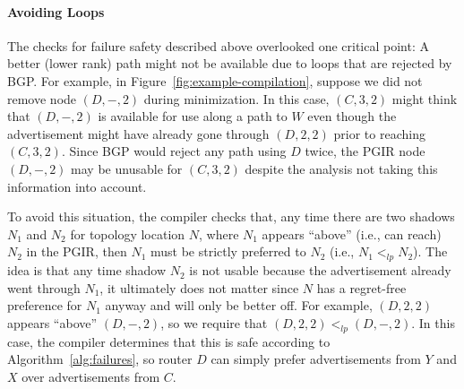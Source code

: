 \documentclass[10pt]{sigalternate052015}
\newcommand{\para}[1]{\paragraph*{\textbf{#1}}}
\begin{document}
\para{Avoiding Loops}

The checks for failure safety described above overlooked one critical point: A better (lower rank) path might not be available due to loops that are rejected by BGP.
%
For example, in Figure~\ref{fig:example-compilation}, suppose we did not remove node $(D,-,2)$ during minimization. In this case, $(C,3,2)$ might think that $(D,-,2)$ is available for use along a path to $W$ even though the advertisement might have already gone through $(D,2,2)$ prior to reaching $(C,3,2)$. Since BGP would reject any path using $D$ twice, the PGIR node $(D,-,2)$ may be unusable for $(C,3,2)$ despite the analysis not taking this information into account.

To avoid this situation, the compiler checks that, any time there are two shadows $N_1$ and $N_2$ for topology location $N$, where $N_1$ appears ``above'' (i.e., can reach) $N_2$ in the PGIR, then $N_1$ must be strictly preferred to $N_2$ (i.e., $N_1 <_{lp} N_2$). The idea is that any time shadow $N_2$ is not usable because the advertisement already went through $N_1$, it ultimately does not matter since $N$ has a regret-free preference for $N_1$ anyway and will only be better off.
%
For example, $(D,2,2)$ appears ``above'' $(D,-,2)$, so we require that $(D,2,2) <_{lp} (D,-,2)$. In this case, the compiler determines that this is safe according to Algorithm~\ref{alg:failures}, so router $D$ can simply prefer advertisements from $Y$ and $X$ over advertisements from $C$.


\end{document}
